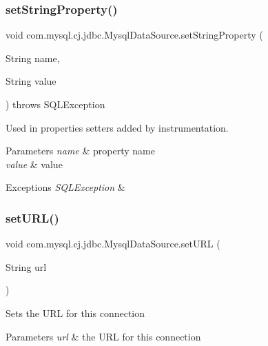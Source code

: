\subsubsection{\texorpdfstring{set\+String\+Property()}{setStringProperty()}}
{\footnotesize\ttfamily void com.\+mysql.\+cj.\+jdbc.\+Mysql\+Data\+Source.\+set\+String\+Property (\begin{DoxyParamCaption}\item[{String}]{name,  }\item[{String}]{value }\end{DoxyParamCaption}) throws S\+Q\+L\+Exception\hspace{0.3cm}{\ttfamily [protected]}}

Used in properties setters added by instrumentation.


\begin{DoxyParams}{Parameters}
{\em name} & property name \\
\hline
{\em value} & value \\
\hline
\end{DoxyParams}

\begin{DoxyExceptions}{Exceptions}
{\em S\+Q\+L\+Exception} & \\
\hline
\end{DoxyExceptions}
\mbox{\label{classcom_1_1mysql_1_1cj_1_1jdbc_1_1_mysql_data_source_a03d52b5b48fb303375e5c1b35b7f52f9}} 
\subsubsection{\texorpdfstring{set\+U\+R\+L()}{setURL()}}
{\footnotesize\ttfamily void com.\+mysql.\+cj.\+jdbc.\+Mysql\+Data\+Source.\+set\+U\+RL (\begin{DoxyParamCaption}\item[{String}]{url }\end{DoxyParamCaption})}

Sets the U\+RL for this connection


\begin{DoxyParams}{Parameters}
{\em url} & the U\+RL for this connection \\
\hline
\end{DoxyParams}
\mbox{\label{classcom_1_1mysql_1_1cj_1_1jdbc_1_1_mysql_data_source_adefc4cd844fa0cae59fcf49163692e4e}} 
